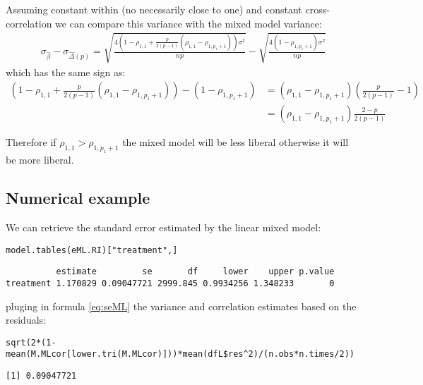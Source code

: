 \documentclass[12pt]{article}
\begin{document}
Assuming constant within (no necessarily close to one) and constant
cross-correlation we can compare this variance with the mixed model
variance:
\begin{align*}
\sigma_{\widehat{\beta}} - \sigma_{\widehat{\Delta}(p)} = \sqrt{\frac{4\left(1-\rho_{1,1} + \frac{p}{2(p-1)}(\rho_{1,1}-\rho_{1,p_1+1})\right) \sigma^2}{n p}} -  \sqrt{\frac{4(1-\rho_{1,p_1+1}) \sigma^2}{np}}
\end{align*}
which has the same sign as:
\begin{align*}
\left(1-\rho_{1,1} + \frac{p}{2(p-1)}(\rho_{1,1}-\rho_{1,p_1+1})\right) - (1-\rho_{1,p_1+1})
& = (\rho_{1,1}-\rho_{1,p_1+1}) \left(\frac{p}{2(p-1)} - 1 \right) \\
& = (\rho_{1,1}-\rho_{1,p_1+1}) \frac{2-p}{2(p-1)} 
\end{align*}

Therefore if \(\rho_{1,1}>\rho_{1,p_1+1}\) the mixed model will be
less liberal otherwise it will be more liberal.

\subsection{Numerical example}
\label{sec:org014ceaa}

We can retrieve the standard error estimated by the linear mixed model:
\lstset{language=r,label= ,caption= ,captionpos=b,numbers=none}
\begin{lstlisting}
model.tables(eML.RI)["treatment",]
\end{lstlisting}

\begin{verbatim}
          estimate         se       df     lower    upper p.value
treatment 1.170829 0.09047721 2999.845 0.9934256 1.348233       0
\end{verbatim}


pluging in formula \autoref{eq:seML} the variance and correlation
estimates based on the residuals:
\lstset{language=r,label= ,caption= ,captionpos=b,numbers=none}
\begin{lstlisting}
sqrt(2*(1-mean(M.MLcor[lower.tri(M.MLcor)]))*mean(dfL$res^2)/(n.obs*n.times/2))
\end{lstlisting}

\begin{verbatim}
[1] 0.09047721
\end{verbatim}




\clearpage

\appendix
\end{document}
